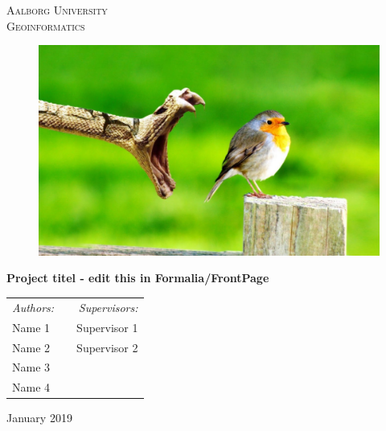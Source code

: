 \thispagestyle{empty}

\begin{center}
\textsc{\LARGE Aalborg University}\\%
\textsc{\Large Geoinformatics}\\[1.cm]
\end{center}

\begin{figure} [H]
	\centering
	\includegraphics[width=1\textwidth]{Pictures/Example.jpg}	
	\label{forside}
\end{figure}

\vfill
\begin{center}
{ \huge \bfseries {Project titel - edit this in Formalia/FrontPage}}\\[0.2cm]
\end{center}

\begin{tabularx}{\textwidth}{l X r}
	\hline
	\emph{Authors:} & & \emph{Supervisors:}\\
	Name 1	&	 &	 Supervisor 1 \\
	Name 2     	&	 &	Supervisor 2  \\
	Name 3		\\
	Name 4       \\
	\hline
\end{tabularx}

\vfill

{\large January 2019}

\frontmatter

